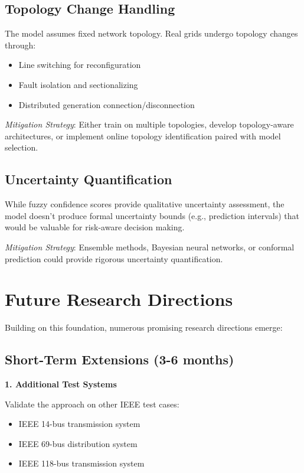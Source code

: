 \documentclass[12pt,a4paper]{report}
\begin{document}
\subsection{Topology Change Handling}

The model assumes fixed network topology. Real grids undergo topology changes through:
\begin{itemize}
    \item Line switching for reconfiguration
    \item Fault isolation and sectionalizing
    \item Distributed generation connection/disconnection
\end{itemize}

\textit{Mitigation Strategy}: Either train on multiple topologies, develop topology-aware architectures, or implement online topology identification paired with model selection.

\subsection{Uncertainty Quantification}

While fuzzy confidence scores provide qualitative uncertainty assessment, the model doesn't produce formal uncertainty bounds (e.g., prediction intervals) that would be valuable for risk-aware decision making.

\textit{Mitigation Strategy}: Ensemble methods, Bayesian neural networks, or conformal prediction could provide rigorous uncertainty quantification.

\section{Future Research Directions}

Building on this foundation, numerous promising research directions emerge:

\subsection{Short-Term Extensions (3-6 months)}

\textbf{1. Additional Test Systems}

Validate the approach on other IEEE test cases:
\begin{itemize}
    \item IEEE 14-bus transmission system
    \item IEEE 69-bus distribution system
    \item IEEE 118-bus transmission system
\end{itemize}
\end{document}
